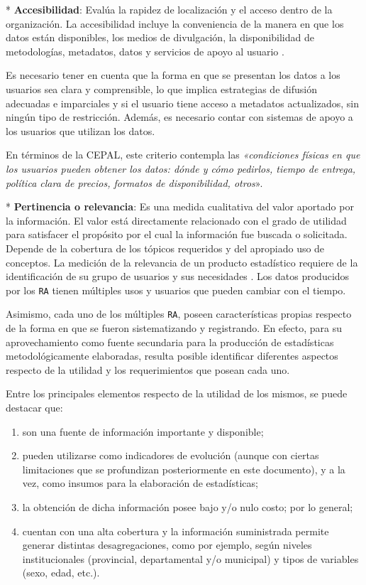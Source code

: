\documentclass[
]{book}
\begin{document}
* \textbf{Accesibilidad}: Evalúa la rapidez de localización y el acceso dentro de la organización. La accesibilidad incluye la conveniencia de la manera en que los datos están disponibles, los medios de divulgación, la disponibilidad de metodologías, metadatos, datos y servicios de apoyo al usuario \citep{oecd2003}.

Es necesario tener en cuenta que la forma en que se presentan los datos a los usuarios sea clara y comprensible, lo que implica estrategias de difusión adecuadas e imparciales y si el usuario tiene acceso a metadatos actualizados, sin ningún tipo de restricción. Además, es necesario contar con sistemas de apoyo a los usuarios que utilizan los datos.

En términos de la CEPAL, este criterio contempla las \emph{«condiciones físicas en que los usuarios pueden obtener los datos: dónde y cómo pedirlos, tiempo de entrega, política clara de precios, formatos de disponibilidad, otros}»\citep{cepal2003}.

* \textbf{Pertinencia o relevancia}: Es una medida cualitativa del valor aportado por la información. El valor está directamente relacionado con el grado de utilidad para satisfacer el propósito por el cual la información fue buscada o solicitada. Depende de la cobertura de los tópicos requeridos y del apropiado uso de conceptos. La medición de la relevancia de un producto estadístico requiere de la identificación de su grupo de usuarios y sus necesidades \citep{oecd2003}. Los datos producidos por los \texttt{RA} tienen múltiples usos y usuarios que pueden cambiar con el tiempo.

Asimismo, cada uno de los múltiples \texttt{RA}, poseen características propias respecto de la forma en que se fueron sistematizando y registrando. En efecto, para su aprovechamiento como fuente secundaria para la producción de estadísticas metodológicamente elaboradas, resulta posible identificar diferentes aspectos respecto de la utilidad y los requerimientos que posean cada uno.

Entre los principales elementos respecto de la utilidad de los mismos, se puede destacar que:

\begin{enumerate}
\def\labelenumi{\roman{enumi})}
\item
  son una fuente de información importante y disponible;
\item
  pueden utilizarse como indicadores de evolución (aunque con ciertas limitaciones que se profundizan posteriormente en este documento), y a la vez, como insumos para la elaboración de estadísticas;
\item
  la obtención de dicha información posee bajo y/o nulo costo; por lo general;
\item
  cuentan con una alta cobertura y la información suministrada permite generar distintas desagregaciones, como por ejemplo, según niveles institucionales (provincial, departamental y/o municipal) y tipos de variables (sexo, edad, etc.).
\end{enumerate}
\end{document}
